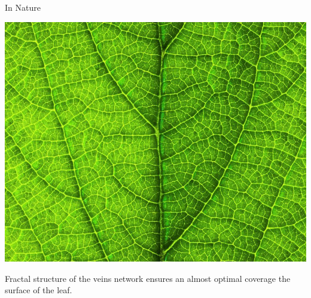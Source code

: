 \documentclass[usenames, dvipsnames, aspectratio=169]{beamer}
\begin{document}
\begin{frame}[t, c]{In Nature}{}
  \vfill
  \large

  \begin{minipage}{.48\textwidth}
    \centering
    \includegraphics[width=\textwidth]{leaf}
  \end{minipage}%
  \hfill
  \begin{minipage}{.48\textwidth}
    Fractal structure of the veins network ensures an almost optimal coverage the surface of the leaf.
  \end{minipage}

  \vfill
\end{frame}
\end{document}
